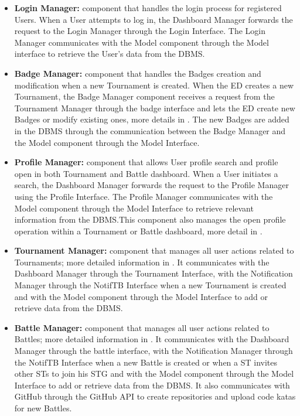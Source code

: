 \begin{itemize}
    \item \textbf{Login Manager:} component that handles the login process for registered Users. When a User attempts to log in, the Dashboard Manager forwards the request to the Login Manager through the Login Interface. The Login Manager communicates with the Model component through the Model interface to retrieve the User's data from the DBMS.
    \item \textbf{Badge Manager:} component that handles the Badges creation and modification when a new Tournament is created. When the ED creates a new Tournament, the Badge Manager component receives a request from the Tournament Manager through the badge interface and lets the ED create new Badges or modify existing ones, more details in . The new Badges are added in the DBMS through the communication between the Badge Manager and the Model component through the Model Interface.
    \item \textbf{Profile Manager:} component that allows User profile search and profile open in both Tournament and Battle dashboard.  When a User initiates a search, the Dashboard Manager forwards the request to the Profile Manager using the Profile Interface. The Profile Manager communicates with the Model component through the Model Interface to retrieve relevant information from the DBMS.This component also manages the open profile operation within a Tournament or Battle dashboard, more detail in .
    \item \textbf{Tournament Manager:} component that manages all user actions related to Tournaments; more detailed information in . It communicates with the Dashboard Manager through the Tournament Interface, with the Notification Manager through the NotifTB Interface when a new Tournament is created and with the Model component through the Model Interface to add or retrieve data from the DBMS.
    \item \textbf{Battle Manager:} component that manages all user actions related to Battles; more detailed information in . It communicates with the Dashboard Manager through the battle interface, with the Notification Manager through the NotifTB Interface when a new Battle is created or when a ST invites other STs to join his STG and with the Model component through the Model Interface to add or retrieve data from the DBMS. It also communicates with GitHub through the GitHub API to create repositories and upload code katas for new Battles.

\end{itemize}
